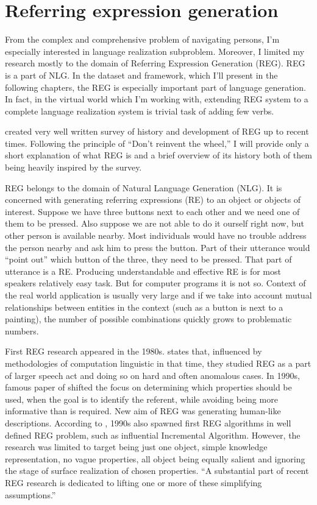 \section{Referring expression generation}
\label{sec:bg-reg}
From the complex and comprehensive problem of navigating persons, I'm especially interested in language realization subproblem. Moreover, I limited my research mostly to the domain of Referring Expression Generation (REG). REG is a part of NLG. In the dataset and framework, which I'll present in the following chapters, the REG is especially important part of language generation. In fact, in the virtual world which I'm working with, extending REG system to a complete language realization system is trivial task of adding few verbs.

\citet{krahmer2012computational} created very well written survey of history and development of REG up to recent times. Following the principle of ``Don't reinvent the wheel,'' I will provide only a short explanation of what REG is and a brief overview of its history both of them being heavily inspired by the survey.

REG belongs to the domain of Natural Language Generation (NLG). It is concerned with generating referring expressions (RE) to an object or objects of interest. Suppose we have three buttons next to each other and we need one of them to be pressed. Also suppose we are not able to do it ourself right now, but other person is available nearby. Most individuals would have no trouble address the person nearby and ask him to press the button. Part of their utterance would ``point out'' which button of the three, they need to be pressed. That part of utterance is a RE. Producing understandable and effective RE is for most speakers relatively easy task. But for computer programs it is not so. Context of the real world application is usually very large and if we take into account mutual relationships between entities in the context (such as a button is next to a painting), the number of possible combinations quickly grows to problematic numbers. 

First REG research appeared in the 1980s. \citet{krahmer2012computational} states that, influenced by methodologies of computation linguistic in that time, they studied REG as a part of larger speech act and doing so on hard and often anomalous cases. In 1990s, famous paper of \citet{dale1995computational} shifted the focus on determining which properties should be used, when the goal is to identify the referent, while avoiding being more informative than is required. New aim of REG was generating human-like descriptions.  According to \citet{krahmer2012computational}, 1990s also spawned first REG algorithms in well defined REG problem, such as influential Incremental Algorithm. However, the research was limited to target being just one object, simple knowledge representation, no vague properties, all object being equally salient and ignoring the stage of surface realization of chosen properties. ``A substantial part of recent REG research is dedicated to lifting one or more of these simplifying assumptions.'' \citep{krahmer2012computational} 

